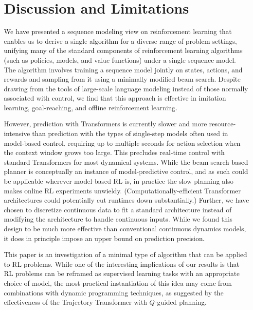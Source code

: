 \section{Discussion and Limitations}
\label{sec:discussion}

We have presented a sequence modeling view on reinforcement learning that enables us to derive a single algorithm for a diverse range of problem settings, unifying many of the standard components of reinforcement learning algorithms (such as policies, models, and value functions) under a single sequence model. The algorithm involves training a sequence model jointly on states, actions, and rewards and sampling from it using a minimally modified beam search.
Despite drawing from the tools of large-scale language modeling instead of those normally associated with control, we find that this approach is effective in imitation learning, goal-reaching, and offline reinforcement learning.

However, prediction with Transformers is currently slower and more resource-intensive than prediction with the types of single-step models often used in model-based control, requiring up to multiple seconds for action selection when the context window grows too large.
This precludes real-time control with standard Transformers for most dynamical systems.
While the beam-search-based planner is conceptually an instance of model-predictive control, and as such could be applicable wherever model-based RL is, in practice the slow planning also makes online RL experiments unwieldy.
(Computationally-efficient Transformer architectures \citep{tay2021long} could potentially cut runtimes down substantially.)
Further, we have chosen to discretize continuous data to fit a standard architecture instead of modifying the architecture to handle continuous inputs.
While we found this design to be much more effective than conventional continuous dynamics models, it does in principle impose an upper bound on prediction precision.

This paper is an investigation of a minimal type of algorithm that can be applied to RL problems.
While one of the interesting implications of our results is that RL problems can be reframed as supervised learning tasks with an appropriate choice of model, the most practical instantiation of this idea may come from combinations with dynamic programming techniques, as suggested by the effectiveness of the Trajectory Transformer with $Q$-guided planning.
